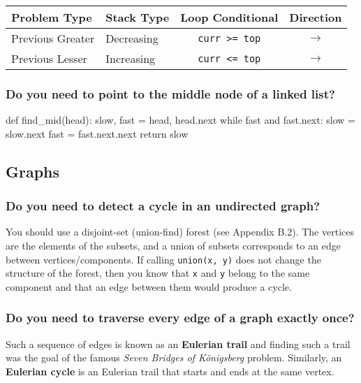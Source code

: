 \documentclass[12pt, titlepage]{article}
\begin{document}
\begin{center}
\begin{tabular}{|l|l|c|c|}
  \hline
  Problem Type & Stack Type & Loop Conditional & Direction \\
  \hline
  Previous Greater & Decreasing & \texttt{curr >= top} & $\rightarrow$ \\
  Previous Lesser & Increasing & \texttt{curr <= top} & $\rightarrow$ \\
  \hline
\end{tabular}
\end{center} \bigskip

\subsubsection{Do you need to point to the middle node of a linked list?}

\begin{python}
def find_mid(head):
    slow, fast = head, head.next
    while fast and fast.next:
        slow = slow.next
        fast = fast.next.next
    return slow
\end{python}

\subsection{Graphs}
\subsubsection{Do you need to detect a cycle in an undirected graph?}

You should use a disjoint-set (union-find) forest (see Appendix B.2). The vertices are the elements of the subsets, and a union of subsets corresponds to an edge between vertices/components. If calling \texttt{union(x, y)} does not change the structure of the forest, then you know that \texttt{x} and \texttt{y} belong to the same component and that an edge between them would produce a cycle.

\subsubsection{Do you need to traverse every edge of a graph exactly once?}

Such a sequence of edges is known as an \textbf{Eulerian trail} and finding such a trail was the goal of the famous \textit{Seven Bridges of K\"onigsberg} problem. Similarly, an \textbf{Eulerian cycle} is an Eulerian trail that starts and ends at the same vertex. \\
\end{document}
